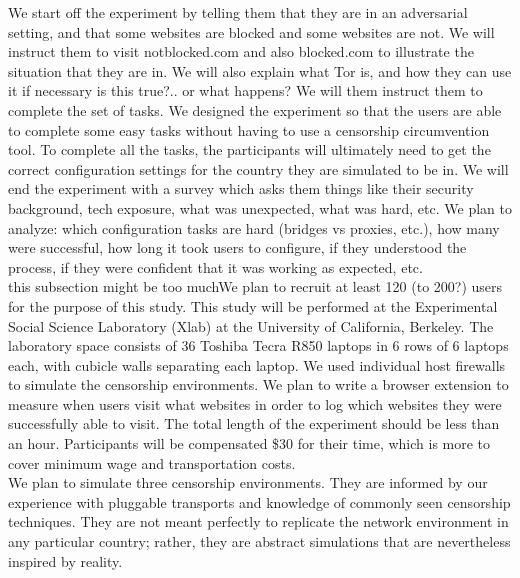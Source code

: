 \documentclass{sig-alternate-hotpets15}
\begin{document}
We start off the experiment by telling them that they are in an adversarial setting, and that some websites are blocked and some websites are not. We will instruct them to visit notblocked.com and also blocked.com to illustrate the situation that they are in. We will also explain what Tor is, and how they can use it if necessary {\color {red} is this true?.. or what happens?} We will them instruct them to complete the set of tasks. We designed the experiment so that the users are able to complete some easy tasks without having to use a censorship circumvention tool. To complete all the tasks, the participants will ultimately need to get the correct configuration settings for the country they are simulated to be in. We will end the experiment with a survey which asks them things like their security background, tech exposure, what was unexpected, what was hard, etc. We plan to analyze: which configuration tasks are hard (bridges vs proxies, etc.), how many were successful, how long it took users to configure, if they understood the process, if they were confident that it was working as expected, etc. \\

{\color {red} this subsection might be too much}We plan to recruit at least 120 (to 200?) users for the purpose of this study. This study will be performed at the Experimental Social Science Laboratory (Xlab) at the University of California, Berkeley. The laboratory space consists of 36 Toshiba Tecra R850 laptops in 6 rows of 6 laptops each, with cubicle walls separating each laptop. We used individual host firewalls to simulate the censorship environments. We plan to write a browser extension to measure when users visit what websites in order to log which websites they were successfully able to visit. The total length of the experiment should be less than an hour. Participants will be compensated \$30 for their time, which is more to cover minimum wage and transportation costs.  \\

We plan to simulate three censorship environments.
They are informed by our experience with pluggable transports
and knowledge of commonly seen censorship techniques.
They are not meant perfectly to replicate the network environment
in any particular country; rather, they are abstract simulations
that are nevertheless inspired by reality.
\end{document}

